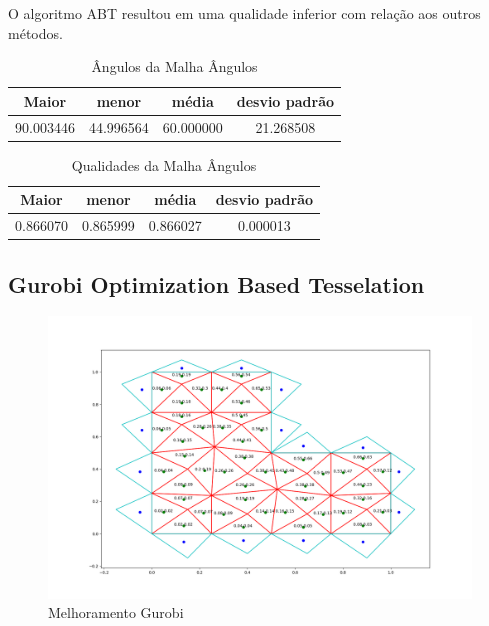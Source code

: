 O algoritmo ABT resultou em uma qualidade inferior com relação aos outros métodos.

\begin{table}[hb]
\centering
\par\caption{Ângulos da Malha Ângulos}
\begin{tabular}{c|c|c|c}
Maior&menor&média&desvio padrão\\\hline\hline
90.003446	&44.996564&60.000000&21.268508\\\hline
\end{tabular}
\label{tab:angulos-malha-angulos}
\end{table}

\begin{table}[hb]
\centering
\par\caption{Qualidades da Malha Ângulos}
\begin{tabular}{c|c|c|c}
Maior&menor&média&desvio padrão\\\hline\hline
0.866070&0.865999&0.866027	&0.000013\\\hline
\end{tabular}
\label{tab:qualidades-malha-angulos}
\end{table}

\newpage
\subsection{Gurobi Optimization Based Tesselation}

\begin{figure}[ht]
    \centering
    \includegraphics[width=1\linewidth]{fig/malha-gurobi.png}
    \caption{Melhoramento Gurobi}
    \label{fig:malha-gurobi}
\end{figure}

